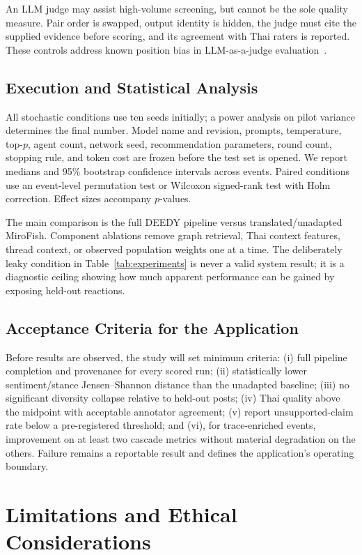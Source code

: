 \documentclass[conference]{IEEEtran}
\begin{document}
An LLM judge may assist high-volume screening, but cannot be the sole quality
measure. Pair order is swapped, output identity is hidden, the judge must cite
the supplied evidence before scoring, and its agreement with Thai raters is
reported. These controls address known position bias in LLM-as-a-judge
evaluation~\cite{shi2024judging}.

\subsection{Execution and Statistical Analysis}

All stochastic conditions use ten seeds initially; a power analysis on pilot
variance determines the final number. Model name and revision, prompts,
temperature, top-$p$, agent count, network seed, recommendation parameters,
round count, stopping rule, and token cost are frozen before the test set is
opened. We report medians and 95\% bootstrap confidence intervals across
events. Paired conditions use an event-level permutation test or Wilcoxon
signed-rank test with Holm correction. Effect sizes accompany $p$-values.

The main comparison is the full DEEDY pipeline versus translated/unadapted
MiroFish. Component ablations remove graph retrieval, Thai context features,
thread context, or observed population weights one at a time. The deliberately
leaky condition in Table~\ref{tab:experiments} is never a valid system result;
it is a diagnostic ceiling showing how much apparent performance can be gained
by exposing held-out reactions.

\subsection{Acceptance Criteria for the Application}

Before results are observed, the study will set minimum criteria: (i) full
pipeline completion and provenance for every scored run; (ii) statistically
lower sentiment/stance Jensen--Shannon distance than the unadapted baseline;
(iii) no significant diversity collapse relative to held-out posts; (iv) Thai
quality above the midpoint with acceptable annotator agreement; (v) report
unsupported-claim rate below a pre-registered threshold; and (vi), for
trace-enriched events, improvement on at least two cascade metrics without
material degradation on the others. Failure remains a reportable result and
defines the application's operating boundary.

\section{Limitations and Ethical Considerations}
\end{document}
